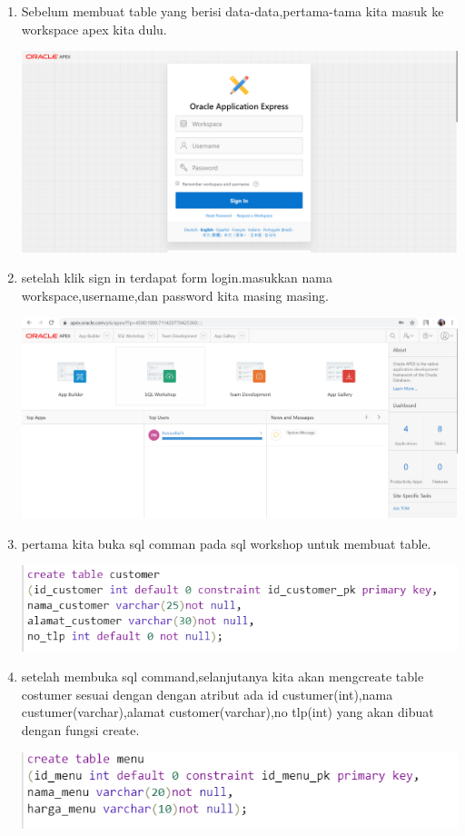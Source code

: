 \documentclass[a4paper, 12pt]{article}
\begin{document}
\begin{enumerate}
\item Sebelum membuat table yang berisi data-data,pertama-tama kita masuk ke workspace apex kita dulu.
\begin{center}
    \includegraphics[width=.8\textwidth]{figure/Login.PNG}
\end{center}
\item setelah klik sign in terdapat form login.masukkan nama workspace,username,dan password kita masing masing.
\begin{center}
    \includegraphics[width=.8\textwidth]{figure/home.PNG}
\end{center}
\item pertama kita buka sql comman pada sql workshop untuk membuat table.
\begin{center}
    \includegraphics[width=.8\textwidth]{figure/20.PNG}
\end{center}
\item setelah membuka sql command,selanjutanya kita akan mengcreate table costumer sesuai dengan dengan atribut ada id custumer(int),nama custumer(varchar),alamat customer(varchar),no tlp(int) yang akan dibuat dengan fungsi create.
\begin{center}
    \includegraphics[width=.8\textwidth]{figure/21.PNG}

\end{center}
\end{enumerate}
\end{document}
